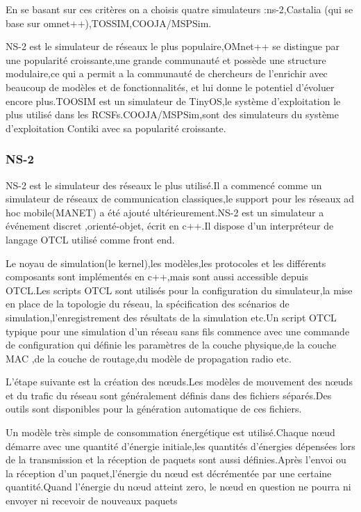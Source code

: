 En se basant sur ces critères on a choisis quatre simulateurs :ns-2,Castalia (qui se base sur omnet++),TOSSIM,COOJA/MSPSim.

NS-2 est le simulateur de réseaux le plus populaire,OMnet++ se distingue par une popularité croissante,une grande communauté et possède une structure modulaire,ce qui a permit a la communauté de chercheurs de l'enrichir avec beaucoup de modèles et de fonctionnalités, et lui donne le potentiel d'évoluer encore plus.TOOSIM est un simulateur de TinyOS,le système d'exploitation le plus utilisé dans les RCSFs.COOJA/MSPSim,sont des simulateurs du système d'exploitation Contiki avec sa popularité croissante. 

  
 \subsubsection{NS-2}
NS-2 est le simulateur des réseaux le plus utilisé.Il a commencé comme un simulateur de réseaux de communication classiques,le support pour les réseaux ad hoc mobile(MANET) a été ajouté ultérieurement.NS-2 est un simulateur a événement discret ,orienté-objet, écrit en c++.Il dispose d'un interpréteur de langage OTCL utilisé comme front end.

Le noyau de simulation(le kernel),les modèles,les protocoles et les différents composants sont implémentés en c++,mais sont aussi accessible depuis OTCL.Les scripts OTCL sont utilisés pour la configuration du simulateur,la mise en place de la topologie du réseau, la spécification des scénarios de simulation,l'enregistrement des résultats de la simulation etc.Un script OTCL typique pour une simulation d'un réseau sans fils commence avec une commande de configuration qui définie les paramètres de la couche physique,de la couche MAC ,de  la couche de routage,du modèle de propagation radio etc.

L'étape suivante est la création des nœuds.Les modèles de mouvement des nœuds et du trafic du réseau sont généralement définis dans des fichiers séparés.Des outils sont disponibles pour la génération automatique de ces fichiers.

Un modèle très simple de consommation énergétique est utilisé.Chaque nœud démarre avec une quantité d'énergie initiale,les quantités d'énergies dépensées lors de la transmission et la réception de paquets sont aussi définies.Après l'envoi ou la réception d'un paquet,l'énergie du nœud est décrémentée par une certaine quantité.Quand l'énergie du nœud atteint zero, le nœud en question ne pourra ni envoyer ni recevoir de nouveaux paquets  

